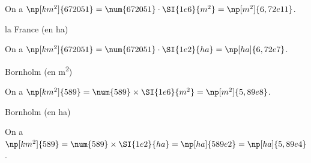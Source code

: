 
\begin{corrige}
On a  $\np[km^2]{672051}=\num{672051}\cdot\SI{1e6}{m^2}=\np[m^2]{6,72e11}$.
\end{corrige}



\begin{enonce}
la France (en \si{ha})
\end{enonce}


\begin{corrige}
On a  $\np[km^2]{672051}=\num{672051}\cdot\SI{1e2}{ha}=\np[ha]{6,72e7}$.
\end{corrige}




\begin{enonce}
Bornholm (en \si{m^2})
\end{enonce}


\begin{corrige}
On a  $\np[km^2]{589}=\num{589}\times \SI{1e6}{m^2}=\np[m^2]{5,89e8}$.
\end{corrige}



\begin{enonce}
Bornholm (en ha)
\end{enonce}


\begin{corrige}
On a $\np[km^2]{589}=\num{589}\times \SI{1e2}{ha}=\np[ha]{589e2}=\np[ha]{5,89e4}$.
\end{corrige}

\finEntrainement







